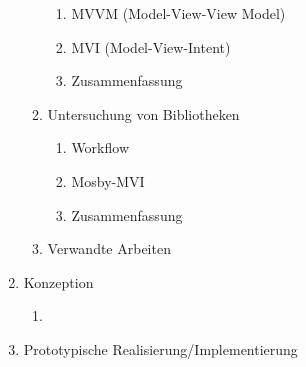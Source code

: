 \begin{enumerate}
\begin{enumerate}
        \begin{enumerate}
            \item MVVM (Model-View-View Model)
            \item MVI (Model-View-Intent)
            \item Zusammenfassung
        \end{enumerate}
        \item Untersuchung von Bibliotheken
        \begin{enumerate}
            \item Workflow
            \item Mosby-MVI
            \item Zusammenfassung
        \end{enumerate}
        \item Verwandte Arbeiten
    \end{enumerate}
    \item Konzeption
    \begin{enumerate}
        \item 
    \end{enumerate}
    \item Prototypische Realisierung/Implementierung
\end{enumerate}